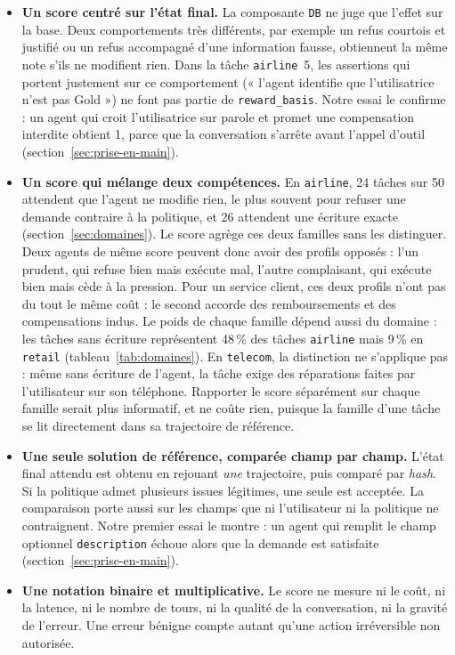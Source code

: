 \begin{itemize}
  \item \textbf{Un score centré sur l'état final.} La composante \texttt{DB} ne juge que l'effet sur la base. Deux comportements très différents, par exemple un refus courtois et justifié ou un refus accompagné d'une information fausse, obtiennent la même note s'ils ne modifient rien. Dans la tâche \texttt{airline}~5, les assertions qui portent justement sur ce comportement (« l'agent identifie que l'utilisatrice n'est pas Gold ») ne font pas partie de \texttt{reward\_basis}. Notre essai le confirme : un agent qui croit l'utilisatrice sur parole et promet une compensation interdite obtient 1, parce que la conversation s'arrête avant l'appel d'outil (section~\ref{sec:prise-en-main}).
  \item \textbf{Un score qui mélange deux compétences.} En \texttt{airline}, 24 tâches sur 50 attendent que l'agent ne modifie rien, le plus souvent pour refuser une demande contraire à la politique, et 26 attendent une écriture exacte (section~\ref{sec:domaines}). Le score agrège ces deux familles sans les distinguer. Deux agents de même score peuvent donc avoir des profils opposés : l'un prudent, qui refuse bien mais exécute mal, l'autre complaisant, qui exécute bien mais cède à la pression. Pour un service client, ces deux profils n'ont pas du tout le même coût : le second accorde des remboursements et des compensations indus. Le poids de chaque famille dépend aussi du domaine : les tâches sans écriture représentent 48\,\% des tâches \texttt{airline} mais 9\,\% en \texttt{retail} (tableau~\ref{tab:domaines}). En \texttt{telecom}, la distinction ne s'applique pas : même sans écriture de l'agent, la tâche exige des réparations faites par l'utilisateur sur son téléphone. Rapporter le score séparément sur chaque famille serait plus informatif, et ne coûte rien, puisque la famille d'une tâche se lit directement dans sa trajectoire de référence.
  \item \textbf{Une seule solution de référence, comparée champ par champ.} L'état final attendu est obtenu en rejouant \emph{une} trajectoire, puis comparé par \emph{hash}. Si la politique admet plusieurs issues légitimes, une seule est acceptée. La comparaison porte aussi sur les champs que ni l'utilisateur ni la politique ne contraignent. Notre premier essai le montre : un agent qui remplit le champ optionnel \texttt{description} échoue alors que la demande est satisfaite (section~\ref{sec:prise-en-main}).
  \item \textbf{Une notation binaire et multiplicative.} Le score ne mesure ni le coût, ni la latence, ni le nombre de tours, ni la qualité de la conversation, ni la gravité de l'erreur. Une erreur bénigne compte autant qu'une action irréversible non autorisée.

\end{itemize}
